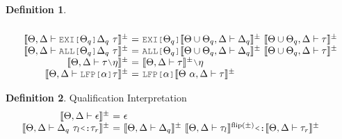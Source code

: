 \documentclass[acmsmall]{acmart}
\theoremstyle{definition}
\newtheorem{definition}{Definition}[section]
\begin{document}
\begin{definition}
\[\begin{array}[t]{r@{}c@{}lcl}
      \\

      \llbracket \Theta, \Delta \entails \J{EXI[}\Theta_q\J{]} \Delta_q\ \tau \rrbracket^\pm 
      &\ =\ & 
      \J{EXI[}\Theta_q\J{]} \llbracket \Theta \cup \Theta_q, \Delta \entails \Delta_q \rrbracket^\pm 
      \ \llbracket \Theta \cup \Theta_q, \Delta \entails \tau \rrbracket^{\pm}

      \\

      \llbracket \Theta, \Delta \entails \J{ALL[}\Theta_q\J{]} \Delta_q\ \tau \rrbracket^\pm 
      &\ =\ & 
      \J{ALL[} \Theta_q \J{]} \llbracket \Theta \cup \Theta_q, \Delta \entails \Delta_q \rrbracket^\pm
      \ \llbracket \Theta \cup \Theta_q, \Delta \entails \tau \rrbracket^{\pm}

      \\

      \llbracket \Theta, \Delta \entails \tau \typdiff \eta \rrbracket^\pm 
      &\ =\ & 
      \llbracket \Theta, \Delta \entails \tau \rrbracket^\pm \typdiff \eta

      \\

      \llbracket \Theta, \Delta \entails \J{LFP[}\alpha \J{]} \tau \rrbracket^\pm 
      &\ =\ & 
      \J{LFP[}\alpha \J{]}\llbracket \Theta\ \alpha, \Delta \entails \tau \rrbracket^{\pm}
      \\
  \end{array}
  \]
\end{definition}

\begin{definition} 
  \label{def:qualification_interpretation}
  Qualification Interpretation 
  \hfill
  \\
  \[
  \begin{array}[t]{r@{}c@{}lcl}
      \llbracket \Theta, \Delta \entails \epsilon \rrbracket^\pm
      &\ =\ & 
      \epsilon
      && 

      \\

      \llbracket \Theta, \Delta \entails \Delta_q \  \tau_l \J{<:} \tau_r \rrbracket^\pm
      &\ =\ & 
      \llbracket \Theta, \Delta \entails \Delta_q\rrbracket^\pm\  
      \llbracket \Theta, \Delta \entails \tau_l \rrbracket^{\text{flip}(\pm)} 
      \J{<:} 
      \llbracket \Theta, \Delta \entails \tau_r \rrbracket^\pm
  \end{array}
  \]
\end{definition} 
\end{document}
